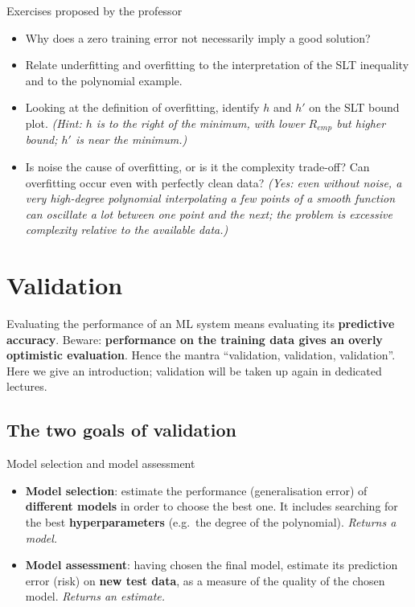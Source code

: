 \begin{boxquestion}{Exercises proposed by the professor}

\begin{itemize}
\tightlist
\item
  Why does a zero training error not necessarily imply a good
  solution?
\item
  Relate underfitting and overfitting to the interpretation of the SLT
  inequality and to the polynomial example.
\item
  Looking at the definition of overfitting, identify \(h\) and \(h'\)
  on the SLT bound plot. \emph{(Hint: \(h\) is to the right of the
  minimum, with lower \(R_{emp}\) but higher bound; \(h'\) is near the
  minimum.)}
\item
  Is noise the cause of overfitting, or is it the complexity
  trade-off? Can overfitting occur even with perfectly clean data?
  \emph{(Yes: even without noise, a very high-degree polynomial
  interpolating a few points of a smooth function can oscillate a lot
  between one point and the next; the problem is excessive complexity
  relative to the available data.)}
\end{itemize}

\end{boxquestion}

\section{Validation}\label{validazione}

Evaluating the performance of an ML system means evaluating its
\textbf{predictive accuracy}. Beware: \textbf{performance on the
training data gives an overly optimistic evaluation}. Hence the mantra
``validation, validation, validation''. Here we give an introduction;
validation will be taken up again in dedicated lectures.

\subsection{The two goals of
validation}\label{i-due-obiettivi-della-validazione}

\begin{boxdefinition}{Model selection and model assessment}

\begin{itemize}
\tightlist
\item
  \textbf{Model selection}: estimate the performance (generalisation
  error) of \textbf{different models} in order to choose the best one.
  It includes searching for the best \textbf{hyperparameters}
  (e.g.\ the degree of the polynomial). \emph{Returns a model.}
\item
  \textbf{Model assessment}: having chosen the final model, estimate
  its prediction error (risk) on \textbf{new test data}, as a measure
  of the quality of the chosen model. \emph{Returns an estimate.}
\end{itemize}

\end{boxdefinition}

